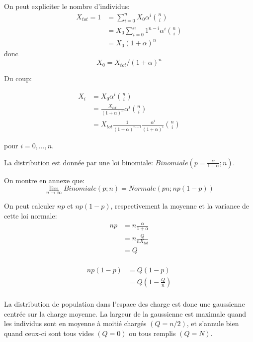 On peut expliciter le nombre d'individus:
\begin{equation}
\begin{aligned}
X_{tot}=1&=\sum_{i=0}^{n}X_0\alpha^i\binom{n}{i}\\
		&= X_0 \sum_{i=0}^n1^{n-i}\alpha^i\binom{n}{i}\\
		&= X_0 (1+\alpha)^n 
\end{aligned}
\end{equation}
donc
\begin{equation}
X_0 = X_{tot}/(1+\alpha)^n
\end{equation}

Du coup:

\begin{equation}
\begin{aligned}
X_i &= X_0 \alpha^i \binom{n}{i}\\
	&= \frac{X_{tot}}{(1+\alpha)^n}\alpha^i \binom{n}{i}\\
	&= X_{tot}\frac{1}{(1+\alpha)^{n-i}}\frac{\alpha^i}{(1+\alpha)^i}\binom{n}{i}
\end{aligned}
\end{equation}

pour $i=0,...,n$.

La distribution est donnée par une loi binomiale: $Binomiale(p=\frac{\alpha}{1+\alpha};n)$.

On montre en annexe que: $$\lim_{n\rightarrow\infty} Binomiale(p;n) = Normale(pn;np(1-p))$$

On peut calculer $np$ et $np(1-p)$, respectivement la moyenne et la variance de cette loi normale:
\begin{equation}
\begin{aligned}
np	&= n \frac{\alpha}{1+\alpha}\\
	&= n \frac{Q}{nX_{tot}}\\
	&= Q\\
\end{aligned}
\end{equation}

\begin{equation}
\begin{aligned}
np(1-p) &= Q(1-p)\\
		&= Q(1-\frac{Q}{n})\\
\end{aligned}
\end{equation}

La distribution de population dans l'espace des charge est donc une gaussienne centrée sur la charge moyenne. La largeur de la gaussienne est maximale quand les individus sont en moyenne à moitié chargés $(Q=n/2)$, et s'annule bien quand ceux-ci sont tous vides $(Q=0)$ ou tous remplis $(Q=N)$.


